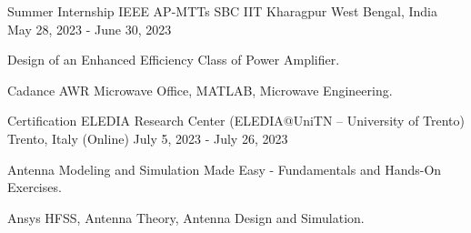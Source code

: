 

\begin{cventries}

  \cventry
    {Summer Internship} %
    {IEEE AP-MTTs SBC IIT Kharagpur} %
    {West Bengal, India} %
    {May 28, 2023 - June 30, 2023} %
    {
      \begin{cvitems} %
        \item {Design of an Enhanced Efficiency Class of Power Amplifier.}
        \item { Cadance AWR Microwave Office, MATLAB, Microwave Engineering.}
      \end{cvitems}
    }


\cventry
{Certification} %
{ELEDIA Research Center (ELEDIA@UniTN – University of Trento)} %
{Trento, Italy (Online)} %
{July 5, 2023 - July 26, 2023} %
{
	\begin{cvitems} %
		\item {Antenna Modeling and Simulation Made Easy - Fundamentals and Hands-On Exercises.}
		\item { Ansys HFSS, Antenna Theory, Antenna Design and Simulation.}
	\end{cvitems}
}

\end{cventries}
